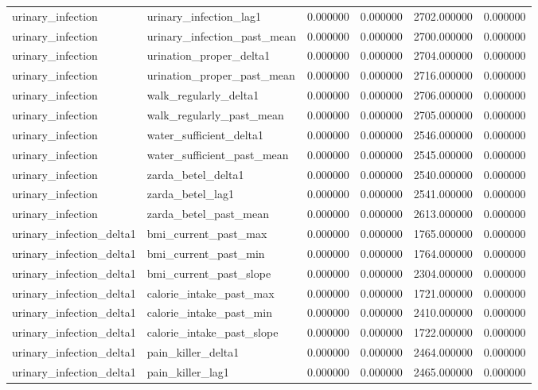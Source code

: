 \begin{longtable}{llrrrr}
urinary\_infection & urinary\_infection\_lag1 & 0.000000 & 0.000000 & 2702.000000 & 0.000000 \\
urinary\_infection & urinary\_infection\_past\_mean & 0.000000 & 0.000000 & 2700.000000 & 0.000000 \\
urinary\_infection & urination\_proper\_delta1 & 0.000000 & 0.000000 & 2704.000000 & 0.000000 \\
urinary\_infection & urination\_proper\_past\_mean & 0.000000 & 0.000000 & 2716.000000 & 0.000000 \\
urinary\_infection & walk\_regularly\_delta1 & 0.000000 & 0.000000 & 2706.000000 & 0.000000 \\
urinary\_infection & walk\_regularly\_past\_mean & 0.000000 & 0.000000 & 2705.000000 & 0.000000 \\
urinary\_infection & water\_sufficient\_delta1 & 0.000000 & 0.000000 & 2546.000000 & 0.000000 \\
urinary\_infection & water\_sufficient\_past\_mean & 0.000000 & 0.000000 & 2545.000000 & 0.000000 \\
urinary\_infection & zarda\_betel\_delta1 & 0.000000 & 0.000000 & 2540.000000 & 0.000000 \\
urinary\_infection & zarda\_betel\_lag1 & 0.000000 & 0.000000 & 2541.000000 & 0.000000 \\
urinary\_infection & zarda\_betel\_past\_mean & 0.000000 & 0.000000 & 2613.000000 & 0.000000 \\
urinary\_infection\_delta1 & bmi\_current\_past\_max & 0.000000 & 0.000000 & 1765.000000 & 0.000000 \\
urinary\_infection\_delta1 & bmi\_current\_past\_min & 0.000000 & 0.000000 & 1764.000000 & 0.000000 \\
urinary\_infection\_delta1 & bmi\_current\_past\_slope & 0.000000 & 0.000000 & 2304.000000 & 0.000000 \\
urinary\_infection\_delta1 & calorie\_intake\_past\_max & 0.000000 & 0.000000 & 1721.000000 & 0.000000 \\
urinary\_infection\_delta1 & calorie\_intake\_past\_min & 0.000000 & 0.000000 & 2410.000000 & 0.000000 \\
urinary\_infection\_delta1 & calorie\_intake\_past\_slope & 0.000000 & 0.000000 & 1722.000000 & 0.000000 \\
urinary\_infection\_delta1 & pain\_killer\_delta1 & 0.000000 & 0.000000 & 2464.000000 & 0.000000 \\
urinary\_infection\_delta1 & pain\_killer\_lag1 & 0.000000 & 0.000000 & 2465.000000 & 0.000000 \\

\end{longtable}
